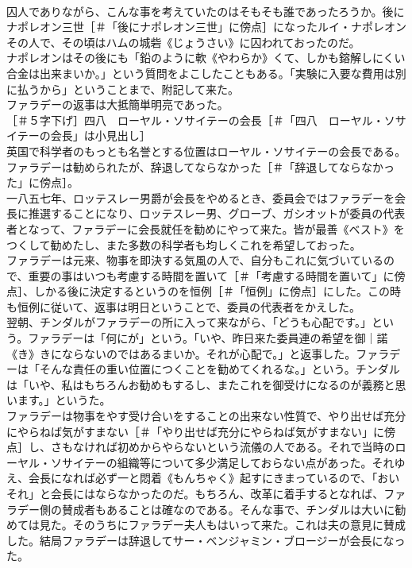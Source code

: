 \documentclass[8pt]{extreport}
\begin{document}
\begin{CJK}{UTF8}{min}
\\	囚人でありながら、こんな事を考えていたのはそもそも誰であったろうか。後にナポレオン三世［＃「後にナポレオン三世」に傍点］になったルイ・ナポレオンその人で、その頃はハムの城砦《じょうさい》に囚われておったのだ。
\\	ナポレオンはその後にも「鉛のように軟《やわらか》くて、しかも鎔解しにくい合金は出来まいか。」という質問をよこしたこともある。「実験に入要な費用は別に払うから」ということまで、附記して来た。
\\	ファラデーの返事は大抵簡単明亮であった。
\\	［＃５字下げ］四八　ローヤル・ソサイテーの会長［＃「四八　ローヤル・ソサイテーの会長」は小見出し］
\\	英国で科学者のもっとも名誉とする位置はローヤル・ソサイテーの会長である。ファラデーは勧められたが、辞退してならなかった［＃「辞退してならなかった」に傍点］。
\\	一八五七年、ロッテスレー男爵が会長をやめるとき、委員会ではファラデーを会長に推選することになり、ロッテスレー男、グローブ、ガシオットが委員の代表者となって、ファラデーに会長就任を勧めにやって来た。皆が最善《ベスト》をつくして勧めたし、また多数の科学者も均しくこれを希望しておった。
\\	ファラデーは元来、物事を即決する気風の人で、自分もこれに気づいているので、重要の事はいつも考慮する時間を置いて［＃「考慮する時間を置いて」に傍点］、しかる後に決定するというのを恒例［＃「恒例」に傍点］にした。この時も恒例に従いて、返事は明日ということで、委員の代表者をかえした。
\\	翌朝、チンダルがファラデーの所に入って来ながら、「どうも心配です。」という。ファラデーは「何にが」という。「いや、昨日来た委員連の希望を御｜諾《き》きにならないのではあるまいか。それが心配で。」と返事した。ファラデーは「そんな責任の重い位置につくことを勧めてくれるな。」という。チンダルは「いや、私はもちろんお勧めもするし、またこれを御受けになるのが義務と思います。」というた。
\\	ファラデーは物事をやす受け合いをすることの出来ない性質で、やり出せば充分にやらねば気がすまない［＃「やり出せば充分にやらねば気がすまない」に傍点］し、さもなければ初めからやらないという流儀の人である。それで当時のローヤル・ソサイテーの組織等について多少満足しておらない点があった。それゆえ、会長になれば必ず一と悶着《もんちゃく》起すにきまっているので、「おいそれ」と会長にはならなかったのだ。もちろん、改革に着手するとなれば、ファラデー側の賛成者もあることは確なのである。そんな事で、チンダルは大いに勧めては見た。そのうちにファラデー夫人もはいって来た。これは夫の意見に賛成した。結局ファラデーは辞退してサー・ベンジャミン・ブロージーが会長になった。

\end{CJK}
\end{document}
